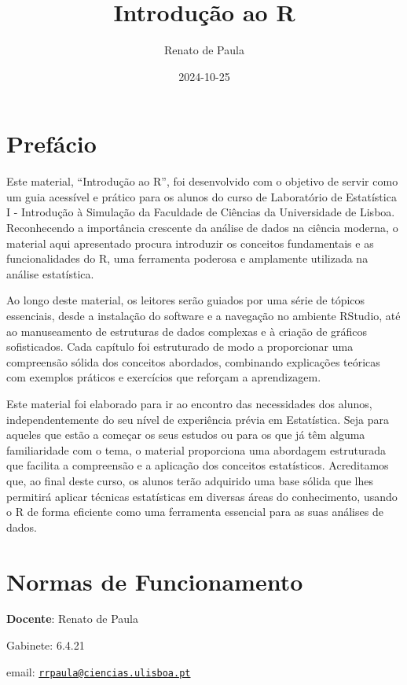 \documentclass[
]{book}
\title{Introdução ao R}
\author{Renato de Paula}
\date{2024-10-25}
\begin{document}
\maketitle

{
\setcounter{tocdepth}{1}
\tableofcontents
}
\chapter{Prefácio}\label{prefuxe1cio}

Este material, ``Introdução ao R'', foi desenvolvido com o objetivo de servir como um guia acessível e prático para os alunos do curso de Laboratório de Estatística I - Introdução à Simulação da Faculdade de Ciências da Universidade de Lisboa. Reconhecendo a importância crescente da análise de dados na ciência moderna, o material aqui apresentado procura introduzir os conceitos fundamentais e as funcionalidades do R, uma ferramenta poderosa e amplamente utilizada na análise estatística.

Ao longo deste material, os leitores serão guiados por uma série de tópicos essenciais, desde a instalação do software e a navegação no ambiente RStudio, até ao manuseamento de estruturas de dados complexas e à criação de gráficos sofisticados. Cada capítulo foi estruturado de modo a proporcionar uma compreensão sólida dos conceitos abordados, combinando explicações teóricas com exemplos práticos e exercícios que reforçam a aprendizagem.

Este material foi elaborado para ir ao encontro das necessidades dos alunos, independentemente do seu nível de experiência prévia em Estatística. Seja para aqueles que estão a começar os seus estudos ou para os que já têm alguma familiaridade com o tema, o material proporciona uma abordagem estruturada que facilita a compreensão e a aplicação dos conceitos estatísticos. Acreditamos que, ao final deste curso, os alunos terão adquirido uma base sólida que lhes permitirá aplicar técnicas estatísticas em diversas áreas do conhecimento, usando o R de forma eficiente como uma ferramenta essencial para as suas análises de dados.

\chapter{Normas de Funcionamento}\label{normas-de-funcionamento}

\textbf{Docente}: Renato de Paula

Gabinete: 6.4.21

email:
\href{mailto:rrpaula@ciencias.ulisboa.pt}{\nolinkurl{rrpaula@ciencias.ulisboa.pt}}
\end{document}
